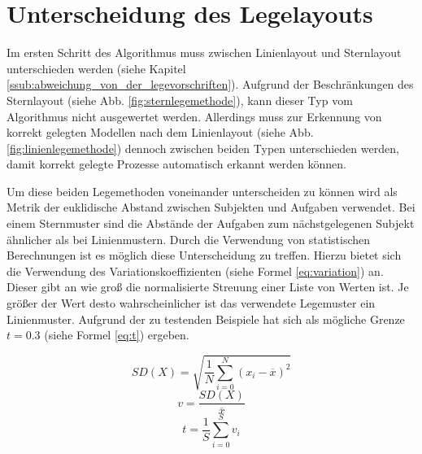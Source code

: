 \section{Unterscheidung des Legelayouts} %
\label{sub:unterscheidung_der_legemethoden}
Im ersten Schritt des Algorithmus muss zwischen Linienlayout und Sternlayout unterschieden werden (siehe Kapitel \ref{ssub:abweichung_von_der_legevorschriften}). Aufgrund der Beschränkungen des Sternlayout (siehe Abb. \ref{fig:sternlegemethode}), kann dieser Typ vom Algorithmus nicht ausgewertet werden. Allerdings muss zur Erkennung von korrekt gelegten Modellen nach dem Linienlayout (siehe Abb. \ref{fig:linienlegemethode}) dennoch zwischen beiden Typen unterschieden werden, damit korrekt gelegte Prozesse automatisch erkannt werden können.

Um diese beiden Legemethoden voneinander unterscheiden zu können wird als Metrik der euklidische Abstand zwischen Subjekten und Aufgaben verwendet. Bei einem Sternmuster sind die Abstände der Aufgaben zum nächstgelegenen Subjekt ähnlicher als bei Linienmustern. Durch die Verwendung von statistischen Berechnungen ist es möglich diese Unterscheidung zu treffen. Hierzu bietet sich die Verwendung des Variationskoeffizienten (siehe Formel \ref{eq:variation}) an. Dieser gibt an wie groß die normalisierte Streuung einer Liste von Werten ist. Je größer der Wert desto wahrscheinlicher ist das verwendete Legemuster ein Linienmuster. Aufgrund der zu testenden Beispiele hat sich als mögliche Grenze $t=0.3$ (siehe Formel \ref{eq:t}) ergeben. 

\begin{equation}
	\label{eq:deviation}
	SD(X)=\sqrt{\frac{1}{N}\sum_{i=0}^{N}\left(x_i - \overline{x}\right)^2} 
\end{equation}
\begin{equation}
	\label{eq:variation}
	v=\frac{SD(X)}{\overline{x}} 
\end{equation}
\begin{equation}
	\label{eq:t}
	t=\frac{1}{S}\sum_{i=0}^{S}v_{i}
\end{equation}

